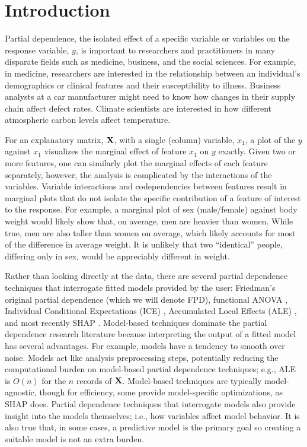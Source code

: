 \documentclass[]{article} %
\begin{document}
\section{Introduction}

Partial dependence, the isolated effect of a specific variable or variables on the response variable, $y$, is important to researchers and practitioners in many disparate fields such as medicine, business, and the social sciences. For example, in medicine, researchers are interested in the relationship between an individual's demographics or clinical features and their susceptibility to illness. Business analysts at a car manufacturer might need to know how changes in their supply chain affect defect rates. Climate scientists are interested in how different atmospheric carbon levels affect temperature.

For an explanatory matrix, $\bf X$, with a single (column) variable, $x_1$, a plot of the $y$ against $x_1$ visualizes the marginal effect of feature $x_1$ on $y$ exactly. Given two or more features, one can similarly plot the marginal effects of each feature separately, however, the analysis is complicated by the interactions of the variables.   Variable interactions and codependencies between features result in marginal plots that do not isolate the specific contribution of a feature of interest to the response. For example, a marginal plot of sex (male/female) against body weight would likely show that, on average, men are heavier than women. While true, men are also taller than women on average, which likely accounts for most of the difference in average weight. It is unlikely that two ``identical'' people, differing only in sex, would be appreciably different in weight.  

Rather than looking directly at the data, there are several partial dependence techniques that interrogate fitted models provided by the user: Friedman's original partial dependence \citep{PDP} (which we will denote FPD), functional ANOVA \citep{fanova}, Individual Conditional Expectations (ICE) \citep{ICE}, Accumulated Local Effects (ALE) \citep{ALE}, and most recently SHAP \citep{shap}.  Model-based techniques dominate the partial dependence research literature because interpreting the output of a fitted model  has several advantages.  For example, models have a tendency to smooth over noise. Models act like analysis preprocessing steps, potentially reducing the computational burden on model-based partial dependence techniques; e.g., ALE is $O(n)$ for the $n$ records of $\bf X$. Model-based techniques are typically model-agnostic, though for efficiency, some provide model-specific optimizations, as SHAP does. Partial dependence techniques that interrogate models also provide insight into the models themselves; i.e., how variables affect model behavior.  It is also true that, in some cases, a predictive model is the primary goal so creating a suitable model is not an extra burden.
\end{document}
